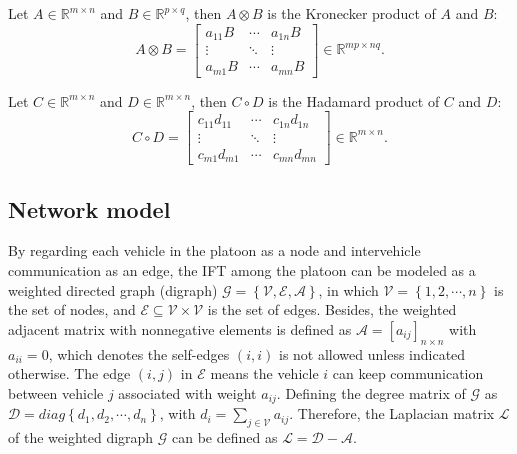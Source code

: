 \documentclass[journal]{IEEEtran}
\begin{document}
Let $A\in\mathbb{R}^{m\times n}$ and $B\in\mathbb{R}^{p\times q}$, then $A\otimes B$ is the Kronecker product of $A$ and $B$:
\begin{equation*}
  A \otimes B = \left[ {\begin{array}{*{20}{c}}
          {{a_{11}}B} & \cdots & {{a_{1n}}B} \\
          \vdots      & \ddots & \vdots      \\
          {{a_{m1}}B} & \cdots & {{a_{mn}}B}
        \end{array}} \right] \in {\mathbb{R}^{mp \times nq}}.
\end{equation*}

Let $C\in\mathbb{R}^{m\times n}$ and $D\in\mathbb{R}^{m\times n}$, then $C\circ D$ is the Hadamard product of $C$ and $D$:
\begin{equation*}
  C \circ D = \left[ {\begin{array}{*{20}{c}}
          {{c_{11}}{d_{11}}} & \cdots & {{c_{1n}}{d_{1n}}} \\
          \vdots             & \ddots & \vdots             \\
          {{c_{m1}}{d_{m1}}} & \cdots & {{c_{mn}}{d_{mn}}}
        \end{array}} \right] \in {\mathbb{R}^{m \times n}}.
\end{equation*}

\subsection{Network model}
\label{Section 2.1}

By regarding each vehicle in the platoon as a node and intervehicle communication as an edge, the IFT among the platoon can be modeled as a weighted directed graph (digraph) $\mathcal{G}=\left\{\mathcal{V}, \mathcal{E}, \mathcal{A}\right\}$, in which $\mathcal{V}=\left\{1,2,\cdots,n\right\}$ is the set of nodes, and $\mathcal{E}\subseteq\mathcal{V}\times\mathcal{V} $ is the set of edges. Besides, the weighted adjacent matrix with nonnegative elements is defined as $\mathcal{A}=[a_{ij}]_{n \times n}$ with $a_{ii}=0$, which denotes the self-edges $\left(i,i\right)$ is not allowed unless indicated otherwise. The edge $\left(i,j\right)$ in $\mathcal{E}$ means the vehicle $i$ can keep communication between vehicle $j$ associated with weight $a_{ij}$. Defining the degree matrix of $\mathcal{G}$ as $\mathcal{D}=diag\left\{d_1,d_2,\cdots,d_n\right\}$, with $d_i=\sum_{j\in\mathcal{V}} a_{ij}$. Therefore, the Laplacian matrix $\mathcal{L}$ of the weighted digraph $\mathcal{G}$ can be defined as $\mathcal{L}=\mathcal{D}-\mathcal{A}$.
\end{document}
